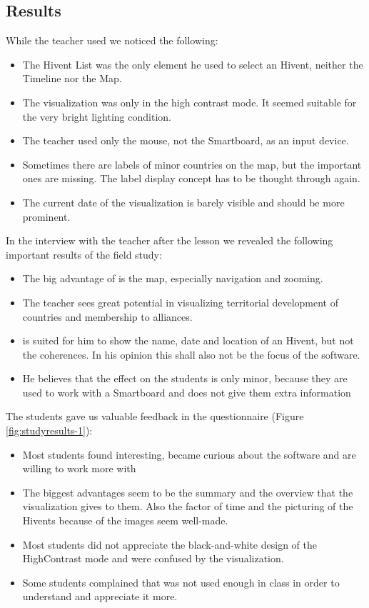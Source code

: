 
\subsection{Results} %
\label{sub:results-1}

While the teacher used \HG we noticed the following:

\begin{itemize}
  \item The Hivent List was the only element he used to select an Hivent, neither the Timeline nor the Map.
  \item The visualization was only in the high contrast mode. It seemed suitable for the very bright lighting condition.
  \item The teacher used only the mouse, not the Smartboard, as an input device.
  \item Sometimes there are labels of minor countries on the map, but the important ones are missing. The label display concept has to be thought through again.
  \item The current date of the visualization is barely visible and should be more prominent.
\end{itemize}

In the interview with the teacher after the lesson we revealed the following important results of the field study:

\begin{itemize}
  \item The big advantage of \HG is the map, especially navigation and zooming.
  \item The teacher sees great potential in visualizing territorial development of countries and membership to alliances.
  \item \HG is suited for him to show the name, date and location of an Hivent, but not the coherences. In his opinion this shall also not be the focus of the software.
  \item He believes that the effect on the students is only minor, because they are used to work with a Smartboard and \HG does not give them extra information
\end{itemize}

The students gave us valuable feedback in the questionnaire (Figure \ref{fig:studyresults-1}):

\begin{itemize}
  \item Most students found \HG interesting, became curious about the software and are willing to work more with \HG
  \item The biggest advantages seem to be the summary and the overview that the visualization gives to them. Also the factor of time and the picturing of the Hivents because of the images seem well-made.
  \item Most students did not appreciate the black-and-white design of the HighContrast mode and were confused by the visualization.
  \item Some students complained that \HG was not used enough in class in order to understand and appreciate it more.
\end{itemize}

